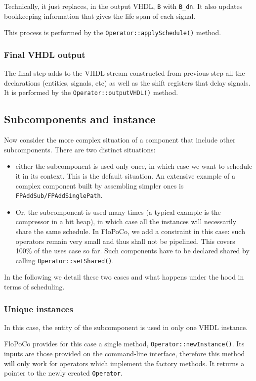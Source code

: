 \documentclass{article}
\begin{document}
Technically, it just replaces, in the output VHDL,   \verb!B! with \verb!B_dn!.
It also updates bookkeeping information that gives the life span of each signal.

This process is performed by the \verb!Operator::applySchedule()! method.

\subsubsection{Final VHDL output}
The final step adds to the VHDL stream constructed from previous step all the declarations (entities, signals, etc) as well as the shift registers that delay signals.
It is performed by the \verb!Operator::outputVHDL()! method.

\subsection{Subcomponents and instance}

Now consider the more complex situation of a component that include other subcomponents.
There are two distinct situations:
\begin{itemize}
\item either the subcomponent is used only once, in which case we want to schedule it in its context.
  This is the default situation.
  An extensive example of a complex component built by assembling simpler ones is \texttt{FPAddSub/FPAddSinglePath}.
  
\item Or, the subcomponent is used many times (a typical example is the compressor in a bit heap), in which case all the instances will necessarily share the same schedule.
  In FloPoCo, we add a constraint in this case: such operators remain very small and thus shall not be pipelined.
  This covers 100\% of the uses case so far.
  Such components have to be declared shared by calling \texttt{Operator::setShared()}.
\end{itemize}

In the following we detail these two cases and what happens under the hood in terms of scheduling.


\subsubsection{Unique instances}
In this case, the entity of the subcomponent is used in only one VHDL instance.

FloPoCo provides for this case a single method, \verb!Operator::newInstance()!.
Its inputs are those provided on the command-line interface, therefore this method will only work for operators which implement the factory methods.
It returns a pointer to the newly created \texttt{Operator}.
\end{document}

